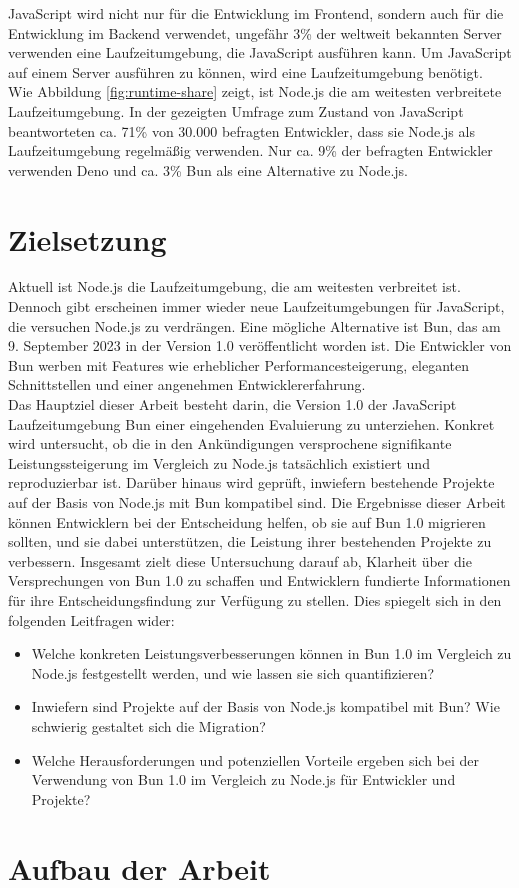 \noindent
JavaScript wird nicht nur für die Entwicklung im Frontend, sondern auch für die Entwicklung im Backend 
verwendet, ungefähr 3\% der weltweit bekannten Server verwenden eine Laufzeitumgebung, die JavaScript 
ausführen kann. \cite{QSuccess.2023} Um JavaScript auf einem Server ausführen zu können, wird eine Laufzeitumgebung benötigt. Wie Abbildung \ref{fig:runtime-share} zeigt, ist Node.js die am weitesten verbreitete Laufzeitumgebung. In der gezeigten Umfrage zum Zustand von JavaScript beantworteten ca. 71\% von 30.000 befragten Entwickler, dass sie Node.js als Laufzeitumgebung regelmäßig verwenden.
Nur ca. 9\% der befragten Entwickler verwenden Deno und ca. 3\% Bun als eine Alternative zu Node.js. \cite{Greif.2022}


\section{Zielsetzung} \label{sec:introduction-target}
Aktuell ist Node.js die Laufzeitumgebung, die am weitesten verbreitet ist. Dennoch gibt erscheinen immer wieder neue Laufzeitumgebungen für JavaScript, die versuchen Node.js zu verdrängen. Eine mögliche Alternative ist Bun, das am 9. September 2023 in der Version 1.0 veröffentlicht worden ist. Die Entwickler von Bun werben mit Features wie erheblicher Performancesteigerung, eleganten Schnittstellen und einer angenehmen Entwicklererfahrung. \cite{Sumner.2023} \\

\noindent
Das Hauptziel dieser Arbeit besteht darin, die Version 1.0 der JavaScript Laufzeitumgebung Bun einer eingehenden Evaluierung zu unterziehen. Konkret wird untersucht, ob die in den Ankündigungen versprochene signifikante Leistungssteigerung im Vergleich zu Node.js tatsächlich existiert und reproduzierbar ist. Darüber hinaus wird geprüft, inwiefern bestehende Projekte auf der Basis von Node.js mit Bun kompatibel sind. Die Ergebnisse dieser Arbeit können Entwicklern bei der Entscheidung helfen, ob sie auf Bun 1.0 migrieren sollten, und sie dabei unterstützen, die Leistung ihrer bestehenden Projekte zu verbessern. Insgesamt zielt diese Untersuchung darauf ab, Klarheit über die Versprechungen von Bun 1.0 zu schaffen und Entwicklern fundierte Informationen für ihre Entscheidungsfindung zur Verfügung zu stellen. Dies spiegelt sich in den folgenden Leitfragen wider:
\begin{itemize}
    \item Welche konkreten Leistungsverbesserungen können in Bun 1.0 im Vergleich zu Node.js festgestellt werden, und wie lassen sie sich quantifizieren?
    \item Inwiefern sind Projekte auf der Basis von Node.js kompatibel mit Bun? Wie schwierig gestaltet sich die Migration?
    \item Welche Herausforderungen und potenziellen Vorteile ergeben sich bei der Verwendung von Bun 1.0 im Vergleich zu Node.js für Entwickler und Projekte?
\end{itemize}

\section{Aufbau der Arbeit} \label{sec:introduction-overview}


